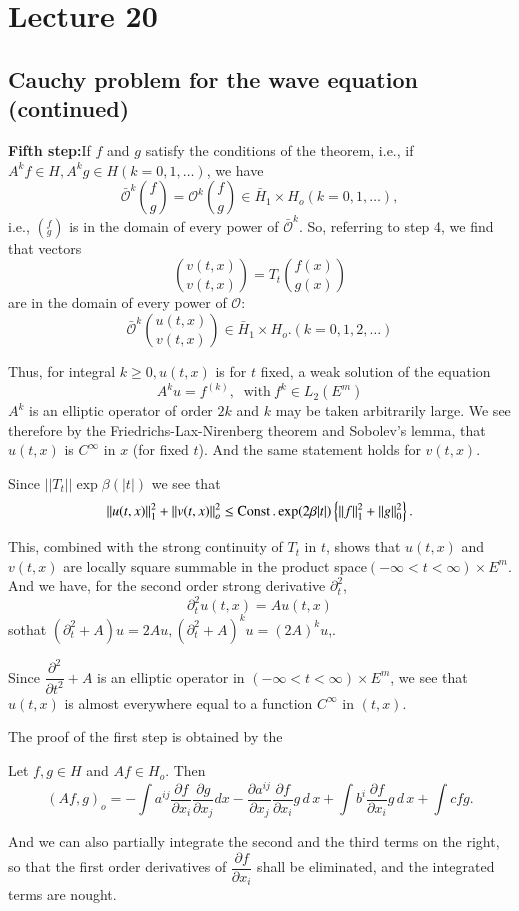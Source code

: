 \chapter{Lecture 20} %

\section{Cauchy problem for the wave equation (continued)}

\textbf{Fifth step:}\pageoriginale If $f$ and $g$ satisfy the conditions of the
theorem, i.e., if $A^k f \in H, A^k g \in H(k = 0, 1, \ldots)$, we
have 
$$
\bar{ \mathscr{O}}^k \binom{f}{g} = \mathscr{O}^k \binom{f}{g} \in
\bar{H}_1 \times H_o ( k = 0, 1, \ldots) ,  
$$
i.e., $(^f_g)$ is in the domain of every power of
$\bar{\mathscr{O}}^k$. So, referring to step 4, we find that vectors 
$$
\binom{v(t, x)}{v(t, x)}= T_t \binom{f(x)}{g(x)}
$$
are in the domain of every power of $\mathscr{O}:$
$$
\bar{\mathscr{O}}^k \binom{u (t, x)}{v(t, x)}
\in \bar{H}_1 \times H_o. ( k = 0, 1, 2, \ldots ) 
$$

Thus, for integral $k \geq 0, u (t,  x )$ is for $t$ fixed, a weak
solution of the equation 
$$
A^k u = f^{(k)}, ~\text{ with}~ f^k \in L_2 (E^m)
$$
$A^k $ is an elliptic operator of order $2k$ and $k$ may be taken
arbitrarily large. We see therefore by the Friedrichs-Lax-Nirenberg
theorem and Sobolev's lemma, that $u(t, x )$ is $C^\infty$ in $x$ (for
fixed $t$). And the same statement holds for $v(t, x )$. 

Since $|| T_t|| \exp \beta (|t|)$ we see that 
$$
|| u (t, x ) ||^2_1 +
|| v(t, x ) ||^2_o \leq \operatorname{Const}. \exp (2 \beta |t|) \left\{|| f||^2_1 +
||g ||^2_0 \right\}.
$$ 

This, combined with the strong continuity of $T_t$ in $t$, shows that
$u(t, x )$ and $ v(t, x )$ are locally square summable in the product
space\break $ (- \infty < t < \infty )\times E^m$. And we have, for the
second order strong derivative $\partial^2_t$, 
$$
\partial^2_t u (t, x ) = A u (t, x ) 
$$
so\pageoriginale that $(\partial^2_t + A ) u = 2 A u, (\partial^2_t + A )^k u =
(2A)^k u$,.  

Since $\dfrac{\partial^2}{\partial t^2} + A $ is an elliptic operator in
$(- \infty < t < \infty) \times E^m$, we see that $u(t, x )$ is almost
everywhere equal to a function $C^\infty$ in $(t, x)$. 

The proof of the first step is obtained by the 
\begin{lemma*}
 Let $f, g \in H$ and $Af\in H_o$. Then 
 $$
 (Af, g )_o = -\int a^{ij} \frac{\partial f}{\partial x_i}
 \frac{\partial g}{\partial x_j} dx -
 \frac{\partial a^{ij}}{\partial x_j} \frac{\partial f}{\partial x_i}
 g \,d \,x + \int b^i 
 \frac{\partial f}{\partial x_i} g \,d \,x + \int c f g. 
 $$

 And we can also partially integrate the second and the third terms on
 the right, so that the first order derivatives of $\dfrac{\partial
  f}{\partial x_i}$ shall be eliminated, and the integrated terms are
 nought.  
\end{lemma*}

